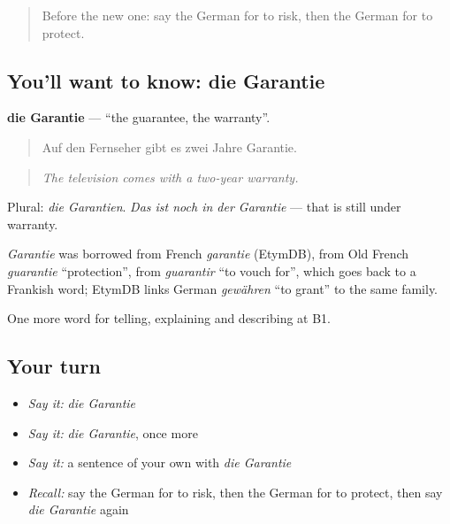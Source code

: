 \label{lesson:GE-C369-garantie}



\begin{quote}
Before the new one: say the German for to risk, then the German for to protect.
\end{quote}

\subsection*{You'll want to know: die Garantie}
\textbf{die Garantie} — \textquotedblleft{}the guarantee, the warranty\textquotedblright{}.

\begin{quote}
Auf den Fernseher gibt es zwei Jahre Garantie.
\end{quote}

\begin{quote}
\emph{The television comes with a two-year warranty.}
\end{quote}

Plural: \emph{die Garantien}. \emph{Das ist noch in der Garantie} — that is still under warranty.

\begin{cousinweb}
\emph{Garantie} was borrowed from French \emph{garantie} (EtymDB), from Old French \emph{guarantie} \textquotedblleft{}protection\textquotedblright{}, from \emph{guarantir} \textquotedblleft{}to vouch for\textquotedblright{}, which goes back to a Frankish word; EtymDB links German \emph{gewähren} \textquotedblleft{}to grant\textquotedblright{} to the same family.
\end{cousinweb}

\begin{grammarlens}[title={What you've built}]
One more word for telling, explaining and describing at B1.
\end{grammarlens}

\subsection*{Your turn}
\begin{itemize}
\raggedright
  \item \emph{Say it:} \emph{die Garantie}
  \item \emph{Say it:} \emph{die Garantie}, once more
  \item \emph{Say it:} a sentence of your own with \emph{die Garantie}
  \item \emph{Recall:} say the German for to risk, then the German for to protect, then say \emph{die Garantie} again
\end{itemize}

